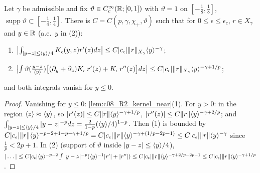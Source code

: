 \begin{lemma}
  \label{lem:c08_R2_near}
  Let $\gamma$ be admissible and fix $\vartheta\in C_c^\infty(\mathbb{R};[0,1])$ with $\vartheta=1$ on $[-\frac18,\frac18]$,
  $\operatorname{supp}\vartheta\subset[-\frac14,\frac14]$. There is $C=C(p,\gamma,\chi_+,\vartheta)$ such that for
  $0\le\epsilon\le\epsilon_c$, $r\in X_\gamma$ and $y\in\mathbb{R}$ (a.e.\ $y$ in (2)):
  \begin{enumerate}
    \item $\bigl|\int_{|y-z|\le\langle y \rangle/4}K_\epsilon(y,z)r'(z)dz\bigr|\le C|c_\epsilon|\|r\|_{X_\gamma}\langle y \rangle^{-\gamma}$;
    \item $\bigl|\int\vartheta(\frac{y-z}{\langle y \rangle})\bigl[(\partial_y+\partial_z)K_\epsilon\,r'(z)+K_\epsilon\,r''(z)\bigr]dz\bigr|\le C|c_\epsilon|\|r\|_{X_\gamma}\langle y \rangle^{-\gamma+1/p}$;
  \end{enumerate}
  and both integrals vanish for $y\le0$.
\end{lemma}
\begin{proof}
  Vanishing for $y\le0$: \cref{lem:c08_R2_kernel_near}(1). For $y>0$: in the region $\langle z \rangle\approx\langle y \rangle$, so
  $|r'(z)|\le C\|r\|\langle y \rangle^{-\gamma+1/p}$, $|r''(z)|\le C\|r\|\langle y \rangle^{-\gamma+2/p}$; and
  $\int_{|y-z|\le\langle y \rangle/4}|y-z|^{-p}dz=\frac{2}{1-p}(\langle y \rangle/4)^{1-p}$. Then (1) is bounded by
  $C|c_\epsilon|\|r\|\langle y \rangle^{-p-2+1-p-\gamma+1/p}=C|c_\epsilon|\|r\|\langle y \rangle^{-\gamma+(1/p-2p-1)}\le C|c_\epsilon|\|r\|\langle y \rangle^{-\gamma}$ since
  $\frac1p<2p+1$. In (2) (support of $\vartheta$ inside $|y-z|\le\langle y \rangle/4$),
  $|\ldots|\le C|c_\epsilon|\langle y \rangle^{-p-2}\int|y-z|^{-p}(\langle y \rangle^{-1}|r'|+|r''|)\le C|c_\epsilon|\|r\|\langle y \rangle^{-\gamma+2/p-2p-1}\le C|c_\epsilon|\|r\|\langle y \rangle^{-\gamma+1/p}$.
\end{proof}


